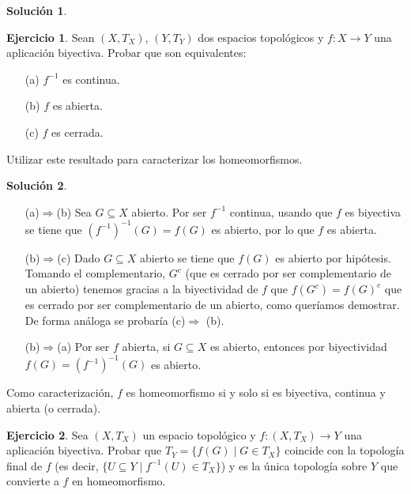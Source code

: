 \documentclass{article}
\theoremstyle{plain}
\theoremstyle{definition}
\newtheorem{exercise}{Ejercicio}
\newtheorem*{sol*}{Solución}
\begin{document}
\begin{sol*}
\end{sol*}

\begin{exercise}
Sean $(X,T_X)$, $(Y,T_Y)$ dos espacios topológicos y $f:X\rightarrow Y$ una aplicación biyectiva. Probar que son equivalentes:
\begin{itemize}
\item[(a)] $f^{-1}$ es continua.
\item[(b)] $f$ es abierta.
\item[(c)] $f$ es cerrada.
\end{itemize}
Utilizar este resultado para caracterizar los homeomorfismos.
\end{exercise}

\begin{sol*}\
\begin{itemize}
\item[(a)$\Rightarrow$(b)] Sea $G\subseteq X$ abierto. Por ser $f^{-1}$ continua, usando que $f$ es biyectiva se tiene que $(f^{-1})^{-1}(G)=f(G)$ es abierto, por lo que $f$ es abierta.
\item[(b)$\Rightarrow$(c)] Dado $G\subseteq X$ abierto se tiene que $f(G)$ es abierto por hipótesis. Tomando el complementario, $G^c$ (que es cerrado por ser complementario de un abierto) tenemos gracias a la biyectividad de $f$ que $f(G^c)=f(G)^c$ que es cerrado por ser complementario de un abierto, como queríamos demostrar. De forma análoga se probaría (c)$\Rightarrow$ (b).
\item[(b)$\Rightarrow$(a)] Por ser $f$ abierta, si $G\subseteq X$ es abierto, entonces por biyectividad $f(G)=(f^{-1})^{-1}(G)$ es abierto. 
\end{itemize}
Como caracterización, $f$ es homeomorfismo si y solo si es biyectiva, continua y abierta (o cerrada). 
\end{sol*}

\begin{exercise}
Sea $(X,T_X)$ un espacio topológico y $f:(X,T_X)\longrightarrow Y$ una aplicación biyectiva. Probar que $T_Y=\{f(G)\mid G\in T_X\}$ coincide con la topología final de $f$ (es decir, $\{U\subseteq Y\mid f^{-1}(U)\in T_X\}$) y es la única topología sobre $Y$ que convierte a $f$ en homeomorfismo.
\end{exercise}
\end{document}
